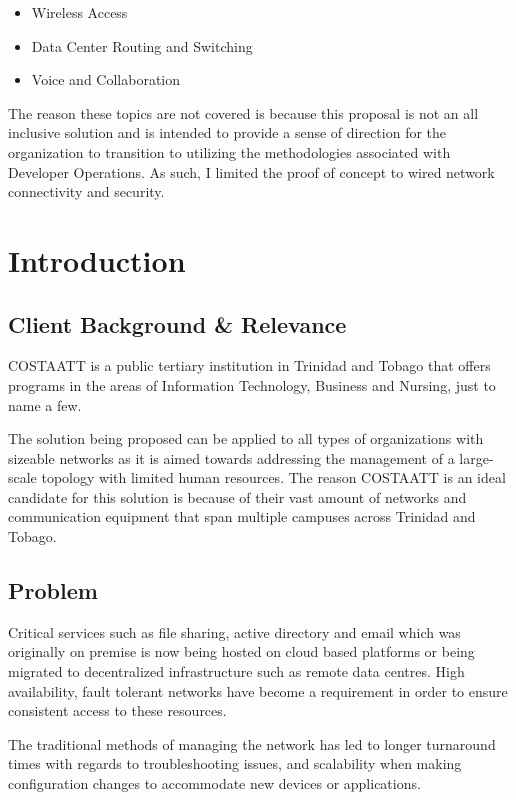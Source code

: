 \documentclass[12pt, letterpaper]{article}
\begin{document}
\begin{itemize}
\item Wireless Access
\item Data Center Routing and Switching
\item Voice and Collaboration
\end{itemize}

The reason these topics are not covered is because this proposal is not an all inclusive solution and is intended to provide a sense of direction for the organization to transition to utilizing the methodologies associated with Developer Operations. As such, I limited the proof of concept to wired network connectivity and security. 

	
	
\newpage
\section{Introduction}

	\subsection{Client Background \& Relevance}
COSTAATT is a public tertiary institution in Trinidad and Tobago that offers programs in the areas of Information Technology, Business and Nursing, just to name a few.
	
\smallskip

The solution being proposed can be applied to all types of organizations with sizeable
networks as it is aimed towards addressing the management of a large-scale topology with limited human resources. The reason COSTAATT is an ideal candidate for this solution is because of their vast amount of networks and communication equipment that span multiple campuses across Trinidad and Tobago. 

	\subsection{Problem}
Critical services such as file sharing, active directory and email which was originally on premise is now being hosted on cloud based platforms or being migrated to decentralized infrastructure such as remote data centres. High availability, fault tolerant networks have become a requirement in order to ensure consistent access to these resources.

\smallskip

The traditional methods of managing the network has led to longer turnaround times with regards to troubleshooting issues, and scalability when making configuration changes to accommodate new devices or applications.
\end{document}
